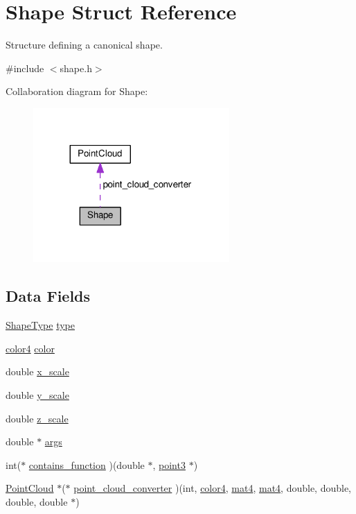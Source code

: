 \hypertarget{struct_shape}{}\section{Shape Struct Reference}
\label{struct_shape}


Structure defining a canonical shape.  




{\ttfamily \#include $<$shape.\+h$>$}



Collaboration diagram for Shape\+:
\nopagebreak
\begin{figure}[H]
\begin{center}
\leavevmode
\includegraphics[width=212pt]{struct_shape__coll__graph}
\end{center}
\end{figure}
\subsection*{Data Fields}
\begin{DoxyCompactItemize}
\item 
\hyperlink{shape_8h_a5a4538eeab397888d88a4eefcc5a1345}{Shape\+Type} \hyperlink{struct_shape_aa987badbde9a01a186366bf0bb305a4b}{type}
\item 
\hyperlink{types_8h_a3d75ae93fc87c7ef6399af18de18ed4a}{color4} \hyperlink{struct_shape_a9c2cebcefe8a6bf5fe495236373a6b66}{color}
\item 
double \hyperlink{struct_shape_a9672a1c41e5dd46a6e5f78070594d865}{x\+\_\+scale}
\item 
double \hyperlink{struct_shape_aa03f352193dc2f09d41e8ac49230ca83}{y\+\_\+scale}
\item 
double \hyperlink{struct_shape_abf9d44d8547f49eefd5a5ebf596cb803}{z\+\_\+scale}
\item 
double $\ast$ \hyperlink{struct_shape_a543b882e1acc4b5299df7a74685922db}{args}
\item 
int($\ast$ \hyperlink{struct_shape_afbf4b798f73deb289c638d2204faa656}{contains\+\_\+function} )(double $\ast$, \hyperlink{types_8h_a5680245085eb6c3661c1ec194979ccd2}{point3} $\ast$)
\item 
\hyperlink{struct_point_cloud}{Point\+Cloud} $\ast$($\ast$ \hyperlink{struct_shape_a41118ddb51e72b975315e29488324787}{point\+\_\+cloud\+\_\+converter} )(int, \hyperlink{types_8h_a3d75ae93fc87c7ef6399af18de18ed4a}{color4}, \hyperlink{types_8h_af8defaae7643cbe46b09ad8dea2eca9b}{mat4}, \hyperlink{types_8h_af8defaae7643cbe46b09ad8dea2eca9b}{mat4}, double, double, double, double $\ast$)
\end{DoxyCompactItemize}


